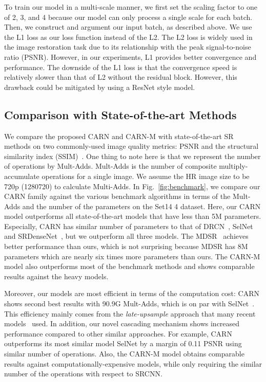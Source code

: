 \documentclass[runningheads]{llncs}
\begin{document}
To train our model in a multi-scale manner, we first set the scaling factor to one of 2, 3, and 4 because our model can only process a single scale for each batch. Then, we construct and argument our input batch, as described above. We use the L1 loss as our loss function instead of the L2. The L2 loss is widely used in the image restoration task due to its relationship with the peak signal-to-noise ratio (PSNR). However, in our experiments, L1 provides better convergence and performance. The downside of the L1 loss is that the convergence speed is relatively slower than that of L2 without the residual block. However, this drawback could be mitigated by using a ResNet style model.

\subsection{Comparison with State-of-the-art Methods}
\label{subsec:comparison}
We compare the proposed CARN and CARN-M with state-of-the-art SR methods on two commonly-used image quality metrics: PSNR and the structural similarity index (SSIM)~\cite{ssim}. One thing to note here is that we represent the number of operations by Mult-Adds. Mult-Adds is the number of composite multiply-accumulate operations for a single image. We assume the HR image size to be 720p (1280720) to calculate Multi-Adds. In Fig.~\ref{fig:benchmark}, we compare our CARN family against the various benchmark algorithms in terms of the Mult-Adds and the number of the parameters on the Set14 4 dataset. Here, our CARN model outperforms all state-of-the-art models that have less than 5M parameters. Especially, CARN has similar number of parameters to that of DRCN~\cite{drcn2016}, SelNet~\cite{selnet} and SRDenseNet~\cite{srdense}, but we outperform all three models. The MDSR~\cite{mdsr2017} achieves better performance than ours, which is not surprising because MDSR has 8M parameters which are nearly six times more parameters than ours. The CARN-M model also outperforms most of the benchmark methods and shows comparable results against the heavy models.

Moreover, our models are most efficient in terms of the computation cost: CARN shows second best results with 90.9G Mult-Adds, which is on par with SelNet~\cite{selnet}. This efficiency mainly comes from the \textit{late-upsample} approach that many recent models~\cite{srdense,lapsrn2017,fsrcnn2016} used. In addition, our novel cascading mechanism shows increased performance compared to other similar approaches. For example, CARN outperforms its most similar model SelNet by a margin of 0.11 PSNR using similar number of operations.
Also, the CARN-M model obtains comparable results against computationally-expensive models, while only requiring the similar number of the operations with respect to SRCNN.
\end{document}

